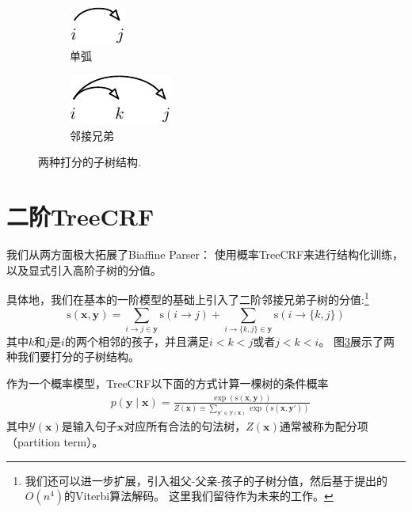 \begin{figure}[tb]
	\centering
	\begin{subfigure}[b]{0.45\textwidth}
		\centering
		\includegraphics[scale=1.5]{figures/scoring-part/arc.pdf}
		\caption{单弧}
		\label{fig:scoring-part-arc}
	\end{subfigure}
	\begin{subfigure}[b]{0.45\textwidth}
		\centering
		\includegraphics[scale=1.5]{figures/scoring-part/sib.pdf}
		\caption{邻接兄弟}
		\label{fig:scoring-part-sib}
	\end{subfigure}
	\caption{两种打分的子树结构.}
	\label{fig:scoring-part}
\end{figure}

\section{二阶TreeCRF}\label{dep-2o-treecrf}
我们从两方面极大拓展了Biaffine Parser：
使用概率TreeCRF来进行结构化训练，以及显式引入高阶子树的分值。

具体地，我们在基本的一阶模型的基础上引入了二阶邻接兄弟子树的分值:\footnote{
	我们还可以进一步扩展，引入祖父-父亲-孩子的子树分值，然后基于\citet{koo-collins-2010-efficient}提出的$O(n^4)$的Viterbi算法解码。
	这里我们留待作为未来的工作。
}
\begin{equation}\label{eq:dep-2otree-score}
	\mathrm{s}(\boldsymbol{x}, \boldsymbol{y}) = \sum_{i\rightarrow j \in \boldsymbol{y}}\mathrm{s}(i\rightarrow j) + \sum_{
		i\rightarrow \{k,j\} \in \boldsymbol{y}
		} \mathrm{s}(i\rightarrow \{k,j\})
\end{equation}
其中$k$和$j$是$i$的两个相邻的孩子，并且满足$i < k < j$或者$j < k < i$。
图\ref{fig:scoring-part}展示了两种我们要打分的子树结构。

作为一个概率模型，TreeCRF以下面的方式计算一棵树的条件概率
\begin{equation}\label{eq:prob-labeled}
	\begin{split}
		& p(\boldsymbol{y}\mid\boldsymbol{x})  = \frac{\exp(\mathrm{s}(\boldsymbol{x},\boldsymbol{y}))}{Z(\boldsymbol{x}) \equiv \sum_{\boldsymbol{y'} \in \mathcal{Y}(\boldsymbol{x})} {\exp(\mathrm{s}(\boldsymbol{x},\boldsymbol{y'}))}}
	\end{split}
\end{equation}
其中$\mathcal{Y}(\boldsymbol{x})$是输入句子$\boldsymbol{x}$对应所有合法的句法树，$Z(\boldsymbol{x})$通常被称为配分项（partition term）。

